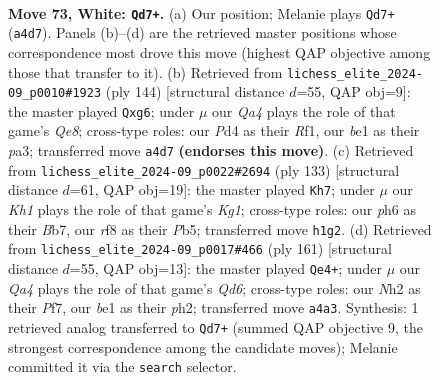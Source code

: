 \documentclass[11pt]{article}
\begin{document}
\clearpage

\begin{figure}[p]\centering
\begin{subfigure}{0.46\textwidth}\centering
\resizebox{\linewidth}{!}{%
\newchessgame
\chessboard[
  setfen={5r1r/pk4p1/1q5p/3p3P/Q2P2P1/4P3/7N/4b2K w - - 1 73},
  showmover=false,
  pgfstyle=straightmove, color=movearrow, markmove={a4-d7}
]}
\caption{}
\end{subfigure}\hfill
\begin{subfigure}{0.46\textwidth}\centering
\resizebox{\linewidth}{!}{%
\newchessgame
\chessboard[
  setfen={4Q3/1kp5/6p1/5p1p/2q4P/pr4P1/5P2/5RK1 w - - 0 73},
  showmover=false,
  pgfstyle=straightmove, color=movearrow, markmove={e8-g6}
]}
\caption{}
\end{subfigure}
\\[4pt]
\begin{subfigure}{0.46\textwidth}\centering
\resizebox{\linewidth}{!}{%
\newchessgame
\chessboard[
  setfen={6k1/1b4p1/4p3/1pP1P1pP/1P4P1/5q2/3Q3K/6R1 b - - 1 67},
  showmover=false,
  pgfstyle=straightmove, color=movearrow, markmove={g8-h7}
]}
\caption{}
\end{subfigure}\hfill
\begin{subfigure}{0.46\textwidth}\centering
\resizebox{\linewidth}{!}{%
\newchessgame
\chessboard[
  setfen={6k1/5pp1/7p/2Q5/pK6/P2q2P1/1P3R1P/1b6 b - - 32 81},
  showmover=false,
  pgfstyle=straightmove, color=movearrow, markmove={d3-e4}
]}
\caption{}
\end{subfigure}
\caption{\textbf{Move 73, White: \texttt{Qd7+}.} (a) Our position; Melanie plays \texttt{Qd7+} (\texttt{a4d7}). Panels (b)--(d) are the retrieved master positions whose correspondence most drove this move (highest QAP objective among those that transfer to it). (b) Retrieved from \texttt{lichess\_elite\_2024-09\_p0010\#1923} (ply 144) [structural distance $d$=55, QAP obj=9]: the master played \texttt{Qxg6}; under $\mu$ our \emph{Qa4} plays the role of that game's \emph{Qe8}; cross-type roles: our \emph{P}d4 as their \emph{R}f1, our \emph{b}e1 as their \emph{p}a3; transferred move \texttt{a4d7} \textbf{(endorses this move)}. (c) Retrieved from \texttt{lichess\_elite\_2024-09\_p0022\#2694} (ply 133) [structural distance $d$=61, QAP obj=19]: the master played \texttt{Kh7}; under $\mu$ our \emph{Kh1} plays the role of that game's \emph{Kg1}; cross-type roles: our \emph{p}h6 as their \emph{B}b7, our \emph{r}f8 as their \emph{P}b5; transferred move \texttt{h1g2}. (d) Retrieved from \texttt{lichess\_elite\_2024-09\_p0017\#466} (ply 161) [structural distance $d$=55, QAP obj=13]: the master played \texttt{Qe4+}; under $\mu$ our \emph{Qa4} plays the role of that game's \emph{Qd6}; cross-type roles: our \emph{N}h2 as their \emph{P}f7, our \emph{b}e1 as their \emph{p}h2; transferred move \texttt{a4a3}. Synthesis: 1 retrieved analog transferred to \texttt{Qd7+} (summed QAP objective 9, the strongest correspondence among the candidate moves); Melanie committed it via the \texttt{search} selector.}
\label{fig:thought-m144}
\end{figure}
\end{document}
